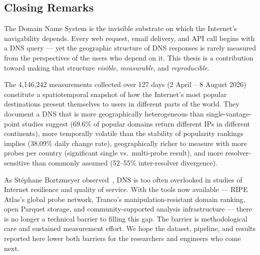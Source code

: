 \bigskip
\subsection{Closing Remarks}
\label{subsec:5.5.4}

The Domain Name System is the invisible substrate on which the Internet's navigability depends. Every web request, email delivery, and \ac{API} call begins with a \ac{DNS} query --- yet the geographic structure of \ac{DNS} responses is rarely measured from the perspectives of the users who depend on it. This thesis is a contribution toward making that structure \emph{visible}, \emph{measurable}, and \emph{reproducible}.

The 4,146,242 measurements collected over 127 days (2 April -- 8 August 2026) constitute a spatiotemporal snapshot of how the Internet's most popular destinations present themselves to users in different parts of the world. They document a \ac{DNS} that is more geographically heterogeneous than single-vantage-point studies suggest (69.6\% of popular domains return different \ac{IP}s in different continents), more temporally volatile than the stability of popularity rankings implies (38.09\% daily change rate), geographically richer to measure with more probes per country (significant single vs.\ multi-probe result), and more resolver-sensitive than commonly assumed (52--55\% inter-resolver divergence).

As Stéphane Bortzmeyer observed~\cite{Bortzmeyer2013}, \ac{DNS} is too often overlooked in studies of Internet resilience and quality of service. With the tools now available --- RIPE Atlas's global probe network, Tranco's manipulation-resistant domain ranking, open Parquet storage, and community-supported analysis infrastructure --- there is no longer a technical barrier to filling this gap. The barrier is methodological care and sustained measurement effort. We hope the dataset, pipeline, and results reported here lower both barriers for the researchers and engineers who come next.
